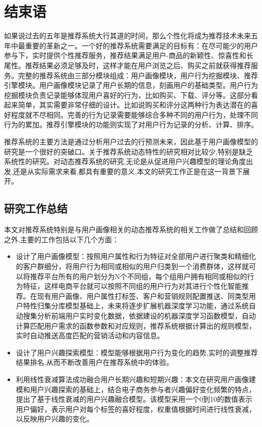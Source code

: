 
\chapter{结束语}
  如果说过去的五年是推荐系统大行其道的时间，那么个性化将成为推荐技术未来五年中最重要的革新之一。一个好的推荐系统需要满足的目标有：在尽可能少的用户参与下，实时提供个性推荐服务，推荐结果满足用户-商品的新颖性、惊喜性和长尾性。推荐结果必须足够及时，这样才能在用户浏览之后、购买之前就获得推荐服务。完整的推荐系统由三部分模块组成：用户画像模块，用户行为挖掘模块、推荐引擎模块。用户画像模块记录了用户长期的信息，刻画用户的基础类型。用户行为挖掘模块负责记录能够体现用户喜好的行为，比如购买、下载、评分等。这部分看起来简单，其实需要非常仔细的设计。比如说购买和评分这两种行为表达潜在的喜好程度就不尽相同。完善的行为记录需要能够综合多种不同的用户行为，处理不同行为的累加。推荐引擎模块的功能则实现了对用户行为记录的分析、计算、排序。

  推荐系统的主要方法是通过分析用户过去的行预测未来，因此基于用户画像模型的研究是一个很好的突破口。关于推荐系统动态特性的研究相对比较少,特别是缺乏系统性的研究。对动态推荐系统的研究,无论是从促进用户兴趣模型的理论角度出发,还是从实际需求来看,都具有重要的意义,本文的研究工作正是在这一背景下展开。

  \section{研究工作总结}
    本文对推荐系统特别是与用户画像相关的动态推荐系统的相关工作做了总结和回顾之外,主要的工作包括以下几个方面：
    \begin{itemize}
      \item 设计了用户画像模型：按照用户属性和行为特征对全部用户进行聚类和精细化的客户群细分，将用户行为相同或相似的用户归类到一个消费群体，这样就可以将推荐平台所有的用户划分为N个不同组，每个组用户拥有相同或相似的行为特征，这样电商平台就可以按照不同组的用户行为对其进行个性化智能推荐。在现有用户画像、用户属性打标签、客户和营销规则配置推送、同类型用户特性归集分库模型基础上，未来将逐步扩展机器深度学习功能，通过系统自动搜集分析前端用户实时变化数据，依据建设的机器深度学习函数模型，自动计算匹配用户需求的函数参数和对应规则，推荐系统根据计算出的规则模型，实时自动推送高度匹配的营销活动和内容信息。
      \item 设计了用户兴趣探索模型：模型能够根据用户行为变化的趋势,实时的调整推荐结果排名,从而不断改善用户在推荐系统中的体验。
      \item 利用线性衰减算法成功融合用户长期兴趣和短期兴趣：本文在研究用户画像建模和用户兴趣探索的基础上，结合电子商务参与者兴趣偏好变化频繁的特点，提出了基于线性衰减的用户兴趣融合模型。该模型采用一个0到10的数值表示用户偏好，表示用户对每个标签的喜好程度，权重值根据时间进行线性衰减，以反映用户兴趣的变化。
    \end{itemize}

